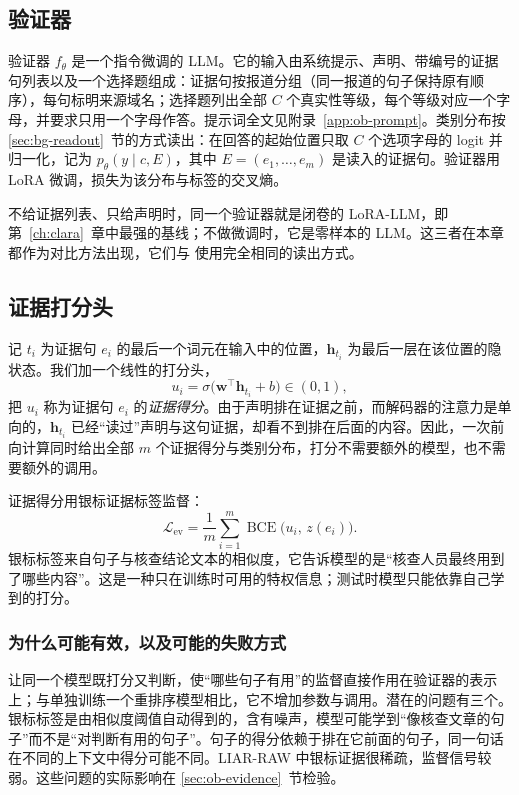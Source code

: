 \subsection{验证器}

验证器 $f_\theta$ 是一个指令微调的 LLM。它的输入由系统提示、声明、带编号的证据句列表以及一个选择题组成：证据句按报道分组（同一报道的句子保持原有顺序），每句标明来源域名；选择题列出全部 $C$ 个真实性等级，每个等级对应一个字母，并要求只用一个字母作答。提示词全文见附录~\ref{app:ob-prompt}。类别分布按 \ref{sec:bg-readout}~节的方式读出：在回答的起始位置只取 $C$ 个选项字母的 logit 并归一化，记为 $p_\theta(y\mid c,E)$，其中 $E=(e_1,\dots,e_m)$ 是读入的证据句。验证器用 LoRA 微调，损失为该分布与标签的交叉熵。

不给证据列表、只给声明时，同一个验证器就是闭卷的 LoRA-LLM，即第~\ref{ch:clara}~章中最强的基线；不做微调时，它是零样本的 LLM。这三者在本章都作为对比方法出现，它们与 \ours{} 使用完全相同的读出方式。

\subsection{证据打分头}\label{sec:ob-head}

记 $t_i$ 为证据句 $e_i$ 的最后一个词元在输入中的位置，$\bm h_{t_i}$ 为最后一层在该位置的隐状态。我们加一个线性的打分头，
\begin{equation}
u_i=\sigma\big(\bm w^{\top}\bm h_{t_i}+b\big)\in(0,1),\label{eq:ob-head}
\end{equation}
把 $u_i$ 称为证据句 $e_i$ 的\emph{证据得分}。由于声明排在证据之前，而解码器的注意力是单向的，$\bm h_{t_i}$ 已经“读过”声明与这句证据，却看不到排在后面的内容。因此，一次前向计算同时给出全部 $m$ 个证据得分与类别分布，打分不需要额外的模型，也不需要额外的调用。

证据得分用银标证据标签监督：
\begin{equation}
\mathcal L_{\mathrm{ev}}=\frac{1}{m}\sum_{i=1}^{m}\operatorname{BCE}\big(u_i,\,z(e_i)\big).
\end{equation}
银标标签来自句子与核查结论文本的相似度，它告诉模型的是“核查人员最终用到了哪些内容”。这是一种只在训练时可用的特权信息；测试时模型只能依靠自己学到的打分。

\subsubsection{为什么可能有效，以及可能的失败方式}
让同一个模型既打分又判断，使“哪些句子有用”的监督直接作用在验证器的表示上；与单独训练一个重排序模型相比，它不增加参数与调用。潜在的问题有三个。银标标签是由相似度阈值自动得到的，含有噪声，模型可能学到“像核查文章的句子”而不是“对判断有用的句子”。句子的得分依赖于排在它前面的句子，同一句话在不同的上下文中得分可能不同。LIAR-RAW 中银标证据很稀疏，监督信号较弱。这些问题的实际影响在 \ref{sec:ob-evidence}~节检验。

